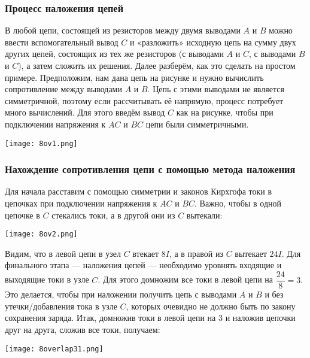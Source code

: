 \documentclass[12pt, a4paper]{article}%
\begin{document}
\subsubsection*{Процесс наложения цепей}

В любой цепи, состоящей из резисторов между двумя выводами $A$ и $B$ можно ввести вспомогательный вывод $C$ и «разложить»
исходную цепь на сумму двух других цепей, состоящих из тех же резисторов (с выводами $A$ и $C$, с выводами $B$ и $C$),
а затем сложить их решения. Далее разберём, как это сделать на простом примере. Предположим, нам дана цепь на рисунке и нужно вычислить сопротивление между выводами
$A$ и $B$. Цепь с этими выводами не является симметричной, поэтому если рассчитывать её напрямую, процесс потребует много вычислений. 
Для этого введём вывод $C$ как на рисунке, чтобы при подключении напряжения к $AC$ и $BC$ цепи были симметричными. 

\begin{center}
\texttt{[image: 8ov1.png]}
\label{fig:mpr}
\end{center}

\subsubsection*{Нахождение сопротивления цепи с помощью метода наложения}

Для начала расставим с помощью симметрии и законов Кирхгофа токи в цепочках при подключении напряжения к $AC$ и $BC$. Важно, чтобы в одной цепочке в $C$ стекались токи, а в другой они из $C$ вытекали:

\begin{center}
\texttt{[image: 8ov2.png]}
\label{fig:mpr}
\end{center}


Видим, что в левой цепи в узел $C$ втекает $8I$, а в правой из $C$ вытекает $24I$. Для финального этапа --- наложения цепей --- необходимо уровнять входящие и выходящие токи в узле $C$. Для этого домножим все токи в левой цепи на $\dfrac{24}{8} = 3$. Это делается, чтобы при наложении получить цепь с выводами $A$ и $B$ и без утечки/добавления тока в узле $C$, которых очевидно не должно быть по закону сохранения заряда.
Итак, домножив токи в левой цепи на $3$ и наложив цепочки друг на друга, сложив все токи, получаем:

\begin{center}
\texttt{[image: 8overlap31.png]}
\label{fig:mpr}
\end{center}
\end{document}
